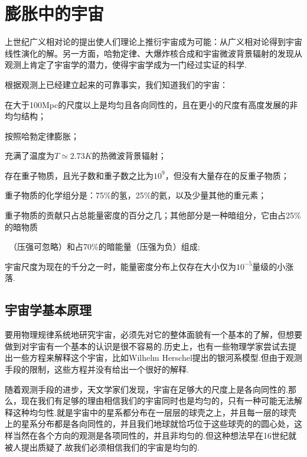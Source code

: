 \documentclass[a4paper]{book}
\begin{document}

\pagestyle{plain}
\tableofcontents



\chapter{膨胀中的宇宙}
上世纪广义相对论的提出使人们理论上推衍宇宙成为可能：从广义相对论得到宇宙线性演化的解。另一方面，哈勃定律、大爆炸核合成和宇宙微波背景辐射的发现从观测上肯定了宇宙学的潜力，使得宇宙学成为一门经过实证的科学.\par 
根据观测上已经建立起来的可靠事实，我们知道我们的宇宙：\par 
\textbullet 在大于100Mpc的尺度以上是均匀且各向同性的，且在更小的尺度有高度发展的非均匀结构； \par 
\textbullet 按照哈勃定律膨胀； \par 
\textbullet 充满了温度为$T\simeq2.73K$的热微波背景辐射； \par 
\textbullet 存在重子物质，且光子数和重子数之比为$10^9$，但没有大量存在的反重子物质；\par 
\textbullet 重子物质的化学组分是：75\%的氢，25\%的氦，以及少量其他的重元素；\par 
\textbullet 重子物质的贡献只占总能量密度的百分之几；其他部分是一种暗组分，它由占25\%的暗物质\par ~（压强可忽略）和占70\%的暗能量（压强为负）组成;\par 
\textbullet 宇宙尺度为现在的千分之一时，能量密度分布上仅存在大小仅为$10^{-5}$量级的小涨落.

\section{宇宙学基本原理}
 要用物理规律系统地研究宇宙，必须先对它的整体面貌有一个基本的了解，但想要做到对宇宙有一个基本的认识是很不容易的.历史上，也有一些物理学家尝试去提出一些方程来解释这个宇宙，比如Wilhelm Herschel提出的银河系模型.但由于观测手段的限制，这些方程并没有给出一个很好的解释.\par 
 随着观测手段的进步，天文学家们发现，宇宙在足够大的尺度上是各向同性的.那么，现在我们有足够的理由相信我们的宇宙同时也是均匀的，只有一种可能无法解释这种均匀性.就是宇宙中的星系都分布在一层层的球壳之上，并且每一层的球壳上的星系分布都是各向同性的，并且我们地球就恰巧位于这些球壳的的圆心处，这样当然在各个方向的观测是各项同性的，并且非均匀的.但这种想法早在16世纪就被人提出质疑了.故我们必须相信我们的宇宙是均匀的.\par 
 
\end{document}
